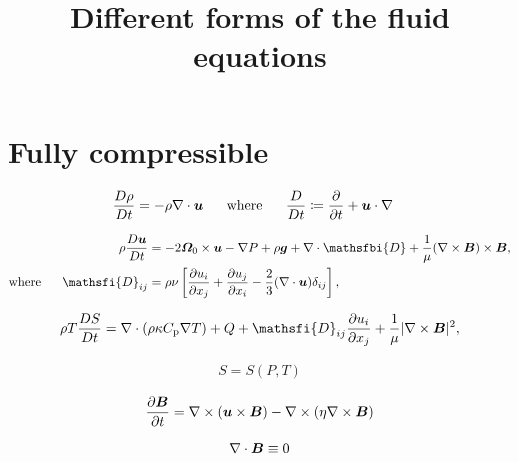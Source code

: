 \documentclass{jfm}
\begin{document}
\title{Different forms of the fluid equations}

\section{Fully compressible}
\begin{align}
\frac{D\rho}{Dt}&=-\rho\nabla\cdot\bm{u}\ \ \ \ \  \text{where}\ \ \ \ \  \frac{D}{Dt}\coloneqq \frac{\partial}{\partial t} + \bm{u}\cdot\nabla
\end{align}

\begin{subequations}\label{eq:mom}
	\begin{align}
		\rho\frac{D\vecu}{Dt}&=-2\bm{\Omega}_0\times\vecu- \nabla P +\rho\vecg +\Div \mathsfbi{D}+\frac{1}{\mu}(\curl\vecb)\times\vecb,\label{eq:mommain}\\
		\where \mathsfi{D}_{ij}& = \rho\nu\left[\pderiv{u_i}{x_j} + \pderiv{u_j}{x_i} - \frac{2}{3}(\Div\vecu)\delta_{ij}\right],\label{eq:momvisc}
	\end{align}
\end{subequations}

\begin{align}\label{eq:en}
	\rho T\frac{DS}{Dt}= \Div(\rho\kappa\cpcap\nabla T) + Q + \mathsfi{D}_{ij}\pderiv{u_i}{x_j} + \frac{1}{\mu}|\curl\vecb|^2,
\end{align}

\begin{align}
S=S(P,T)
\end{align}

\begin{align}
\frac{\partial\bm{B}}{\partial t}=\nabla\times(\bm{u}\times\bm{B}) - \nabla\times(\eta\nabla\times\bm{B})
\end{align}

\begin{align}
\nabla\cdot\bm{B}\equiv0
\end{align}
\end{document}
